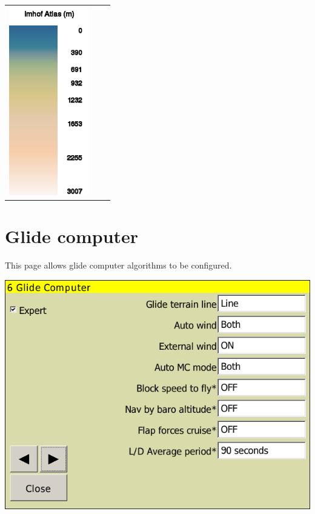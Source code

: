 \documentclass[a4paper,12pt]{refrep}
\begin{document}
\begin{maxipage}
\begin{longtable}{c c c}
\includegraphics[angle=0,width=3.5cm,keepaspectratio='true']{figures/ramp-terrain-imhofatlas.png}& & \\

\end{longtable}
\end{maxipage}

\clearpage
\section{Glide computer}\label{sec:final-glide}

This page allows glide computer algorithms to be configured.

\begin{center}
\includegraphics[angle=0,width=\linewidth,keepaspectratio='true']{figures/config-glidecomputer.png}
\end{center}
\end{document}
